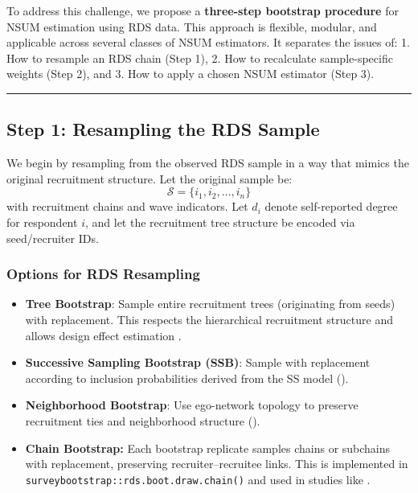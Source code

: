 \documentclass[
  12pt,
  letterpaper,
  DIV=11,
  numbers=noendperiod]{scrartcl}
\providecommand{\tightlist}{%
  \setlength{\itemsep}{0pt}\setlength{\parskip}{0pt}}
\theoremstyle{plain}
\theoremstyle{definition}
\begin{document}
To address this challenge, we propose a \textbf{three-step bootstrap
procedure} for NSUM estimation using RDS data. This approach is
flexible, modular, and applicable across several classes of NSUM
estimators. It separates the issues of: 1. How to resample an RDS chain
(Step 1), 2. How to recalculate sample-specific weights (Step 2), and 3.
How to apply a chosen NSUM estimator (Step 3).

\begin{center}\rule{0.5\linewidth}{0.5pt}\end{center}

\subsection{Step 1: Resampling the RDS
Sample}\label{step-1-resampling-the-rds-sample}

We begin by resampling from the observed RDS sample in a way that mimics
the original recruitment structure. Let the original sample be: \[
\mathcal{S} = \{i_1, i_2, \dots, i_n\}
\] with recruitment chains and wave indicators. Let \(d_i\) denote
self-reported degree for respondent \(i\), and let the recruitment tree
structure be encoded via seed/recruiter IDs.

\subsubsection{Options for RDS
Resampling}\label{options-for-rds-resampling}

\begin{itemize}
\tightlist
\item
  \textbf{Tree Bootstrap}: Sample entire recruitment trees (originating
  from seeds) with replacement. This respects the hierarchical
  recruitment structure and allows design effect estimation
  \autocite{salg06-variance}.
\item
  \textbf{Successive Sampling Bootstrap (SSB)}: Sample with replacement
  according to inclusion probabilities derived from the SS model
  (\textcite{gile11-improv}).
\item
  \textbf{Neighborhood Bootstrap}: Use ego-network topology to preserve
  recruitment ties and neighborhood structure
  (\textcite{yauc22-neighboor}).
\item
  \textbf{Chain Bootstrap:} Each bootstrap replicate samples chains or
  subchains with replacement, preserving recruiter--recruitee links.
  This is implemented in \texttt{surveybootstrap::rds.boot.draw.chain()}
  and used in studies like \textcite{weir12-comparison}.
\end{itemize}
\end{document}
